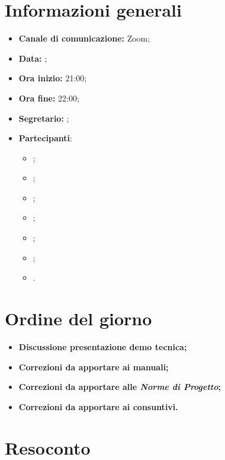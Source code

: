 \section{Informazioni generali}

\begin{itemize}

    \item \textbf{Canale di comunicazione:} Zoom;

    \item \textbf{Data:} \DataMeeting{};

    \item \textbf{Ora inizio:} 21:00;

    \item \textbf{Ora fine:} 22:00;

    \item \textbf{Segretario:} \ACapoRedazione{};

    \item \textbf{Partecipanti}:
        \begin{itemize}
            \item \Daniele{};
            \item \Davide{};
            \item \Francesco{};
            \item \Giosue{};
            \item \Lucrezia{};
            \item \Matteo{};
            \item \Tommaso{}.
        \end{itemize}
\end{itemize}

\section{Ordine del giorno}

\begin{itemize}
    \item\textbf{Discussione presentazione demo tecnica;}
    \item\textbf{Correzioni da apportare ai manuali;}
    \item\textbf{Correzioni da apportare alle \textit{Norme di Progetto};}
    \item\textbf{Correzioni da apportare ai consuntivi.}
\end{itemize}
\newpage


\section{Resoconto}

